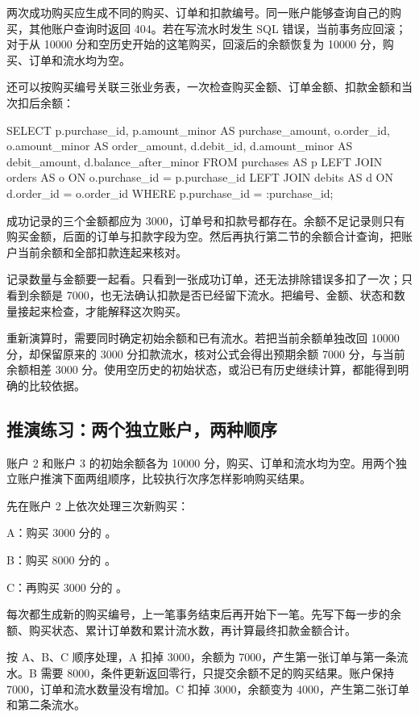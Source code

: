 两次成功购买应生成不同的购买、订单和扣款编号。同一账户能够查询自己的购买，其他账户查询时返回 404。若在写流水时发生 SQL 错误，当前事务应回滚；对于从 10000 分和空历史开始的这笔购买，回滚后的余额恢复为 10000 分，购买、订单和流水均为空。

还可以按购买编号关联三张业务表，一次检查购买金额、订单金额、扣款金额和当次扣后余额：

\begin{BookCode}
SELECT p.purchase_id,
       p.amount_minor AS purchase_amount,
       o.order_id, o.amount_minor AS order_amount,
       d.debit_id, d.amount_minor AS debit_amount,
       d.balance_after_minor
FROM purchases AS p
LEFT JOIN orders AS o ON o.purchase_id = p.purchase_id
LEFT JOIN debits AS d ON d.order_id = o.order_id
WHERE p.purchase_id = :purchase_id;
\end{BookCode}

成功记录的三个金额都应为 3000，订单号和扣款号都存在。余额不足记录则只有购买金额，后面的订单与扣款字段为空。然后再执行第二节的余额合计查询，把账户当前余额和全部扣款连起来核对。

记录数量与金额要一起看。只看到一张成功订单，还无法排除错误多扣了一次；只看到余额是 7000，也无法确认扣款是否已经留下流水。把编号、金额、状态和数量接起来检查，才能解释这次购买。

重新演算时，需要同时确定初始余额和已有流水。若把当前余额单独改回 10000 分，却保留原来的 3000 分扣款流水，核对公式会得出预期余额 7000 分，与当前余额相差 3000 分。使用空历史的初始状态，或沿已有历史继续计算，都能得到明确的比较依据。

\subsection*{推演练习：两个独立账户，两种顺序}

账户 2 和账户 3 的初始余额各为 10000 分，购买、订单和流水均为空。用两个独立账户推演下面两组顺序，比较执行次序怎样影响购买结果。

先在账户 2 上依次处理三次新购买：

\noindent A：购买 3000 分的 。

\noindent B：购买 8000 分的 。

\noindent C：再购买 3000 分的 。

每次都生成新的购买编号，上一笔事务结束后再开始下一笔。先写下每一步的余额、购买状态、累计订单数和累计流水数，再计算最终扣款金额合计。

按 A、B、C 顺序处理，A 扣掉 3000，余额为 7000，产生第一张订单与第一条流水。B 需要 8000，条件更新返回零行，只提交余额不足的购买结果。账户保持 7000，订单和流水数量没有增加。C 扣掉 3000，余额变为 4000，产生第二张订单和第二条流水。

